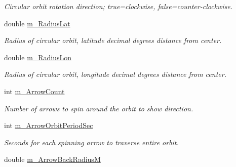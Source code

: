 \begin{DoxyCompactItemize}
\begin{DoxyCompactList}\small\item\em Circular orbit rotation direction; true=clockwise, false=counter-\/clockwise. \end{DoxyCompactList}\item 
\hypertarget{class_circular_orbit_belief_a298222e264bf4622ed900798bb30423a}{
double \hyperlink{class_circular_orbit_belief_a298222e264bf4622ed900798bb30423a}{m\_\-RadiusLat}}
\label{class_circular_orbit_belief_a298222e264bf4622ed900798bb30423a}

\begin{DoxyCompactList}\small\item\em Radius of circular orbit, latitude decimal degrees distance from center. \end{DoxyCompactList}\item 
\hypertarget{class_circular_orbit_belief_a391c10546d6b038a045a9c01a1a481a5}{
double \hyperlink{class_circular_orbit_belief_a391c10546d6b038a045a9c01a1a481a5}{m\_\-RadiusLon}}
\label{class_circular_orbit_belief_a391c10546d6b038a045a9c01a1a481a5}

\begin{DoxyCompactList}\small\item\em Radius of circular orbit, longitude decimal degrees distance from center. \end{DoxyCompactList}\item 
\hypertarget{class_circular_orbit_belief_ad09afe6875687a7e8deff3c4e3aff338}{
int \hyperlink{class_circular_orbit_belief_ad09afe6875687a7e8deff3c4e3aff338}{m\_\-ArrowCount}}
\label{class_circular_orbit_belief_ad09afe6875687a7e8deff3c4e3aff338}

\begin{DoxyCompactList}\small\item\em Number of arrows to spin around the orbit to show direction. \end{DoxyCompactList}\item 
\hypertarget{class_circular_orbit_belief_a1973a1f6a38379a06412994b1551fdd0}{
int \hyperlink{class_circular_orbit_belief_a1973a1f6a38379a06412994b1551fdd0}{m\_\-ArrowOrbitPeriodSec}}
\label{class_circular_orbit_belief_a1973a1f6a38379a06412994b1551fdd0}

\begin{DoxyCompactList}\small\item\em Seconds for each spinning arrow to traverse entire orbit. \end{DoxyCompactList}\item 
\hypertarget{class_circular_orbit_belief_aee7d381354be4f39567ebe2709691440}{
double \hyperlink{class_circular_orbit_belief_aee7d381354be4f39567ebe2709691440}{m\_\-ArrowBackRadiusM}}
\label{class_circular_orbit_belief_aee7d381354be4f39567ebe2709691440}


\end{DoxyCompactItemize}
